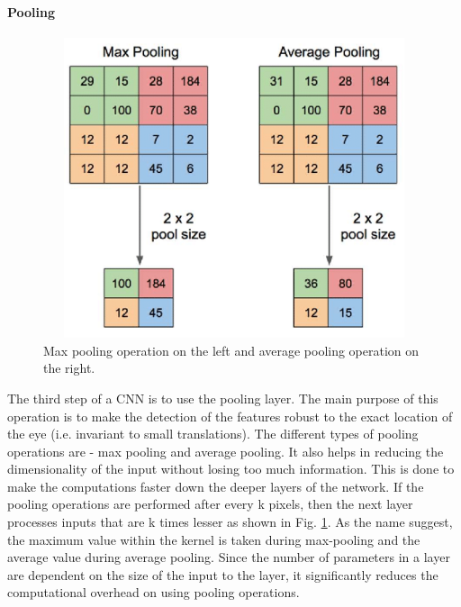 \paragraph{Pooling}

\begin{figure}[t]
  \centering
  \includegraphics[width=400pt,height=250pt]{pictures/pooling.PNG}
  \caption{Max pooling operation on the left and average pooling operation on the right.\cite{pooling}}
  \label{fig:pooling}
\end{figure} 

The third step of a \ac{CNN} is to use the pooling layer. The main purpose of this operation is to make the detection of the features robust to the exact location of the eye (i.e. invariant to small translations). The different types of pooling operations are - max pooling and average pooling. It also helps in reducing the dimensionality of the input without losing too much information. This is done to make the computations faster down the deeper layers of the network. If the pooling operations are performed after every k pixels, then the next layer processes inputs that are k times lesser as shown in Fig. \ref{fig:pooling}. As the name suggest, the maximum value within the kernel is taken during max-pooling and the average value during average pooling. Since the number of parameters in a layer are dependent on the size of the input to the layer, it significantly reduces the computational overhead on using pooling operations.

